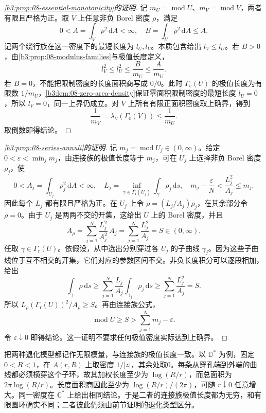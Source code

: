 \begin{proof}[\cref{b3:prop:08-essential-monotonicity}的证明]
记 \(m_U=\operatorname{mod}U\)、\(m_V=\operatorname{mod}V\)，两者有限且严格为正。取 \(V\) 上任意非负 Borel 密度 \(\rho\)，满足
\[
 0<A=\int_V\rho^2\,\mathrm dA<\infty,
 \quad B=\int_U\rho^2\,\mathrm dA\le A.
\]
记两个绕行族在这一密度下的最短长度为 \(l_U,l_V\)。本质包含给出 \(l_V\le l_U\)。若 \(B>0\)，由\cref{b3:prop:08-modulus-families}与极值长度定义，
\[
 l_V^2\le l_U^2\le\frac{B}{m_U}\le\frac{A}{m_U}.
\]
若 \(B=0\)，不能把限制密度的长度面积商写成 \(0/0\)。此时 \(\Gamma_{\mathrm c}(U)\) 的极值长度为有限数 \(1/m_U\)，\cref{b3:lem:08-zero-area-density}保证零面积限制密度的最短长度 \(l_U=0\)，所以 \(l_V=0\)，同一上界仍成立。对 \(V\) 上所有有限正面积密度取上确界，得到
\[
 \frac1{m_V}=\lambda_V(\Gamma_{\mathrm c}(V))\le\frac1{m_U}.
\]
取倒数即得结论。
\end{proof}

\begin{proof}[\cref{b3:prop:08-series-annuli}的证明]
记 \(m_j=\operatorname{mod}U_j\in(0,\infty)\)。给定 \(0<\varepsilon<\min_jm_j\)，由连接族的极值长度等于 \(m_j\)，可在 \(U_j\) 上选择非负 Borel 密度 \(\rho_j\)，使
\[
 0<A_j=\int_{U_j}\rho_j^2\,\mathrm dA<\infty,
 \quad L_j=\inf_{\gamma\in\Gamma_{\mathrm r}(U_j)}
          \int_\gamma\rho_j\,\mathrm ds,
 \quad m_j-\frac\varepsilon N<\frac{L_j^2}{A_j}\le m_j.
\]
因此每个 \(L_j\) 都有限且严格为正。在 \(U_j\) 上令 \(\rho=(L_j/A_j)\rho_j\)，在其余部分令 \(\rho=0\)。由于 \(U_j\) 是两两不交的开集，这给出 \(U\) 上的 Borel 密度，并且
\[
 A_\rho=\sum_{j=1}^N\frac{L_j^2}{A_j^2}\,A_j
 =\sum_{j=1}^N\frac{L_j^2}{A_j}=S\in(0,\infty).
\]
任取 \(\gamma\in\Gamma_{\mathrm r}(U)\)。依假设，从中选出分别穿过各 \(U_j\) 的子曲线 \(\gamma_j\)。因为这些子曲线位于互不相交的开集，它们对应的参数区间不交。非负长度积分可以逐段相加，给出
\[
 \int_\gamma\rho\,\mathrm ds
 \ge\sum_{j=1}^N\frac{L_j}{A_j}
       \int_{\gamma_j}\rho_j\,\mathrm ds
 \ge\sum_{j=1}^N\frac{L_j^2}{A_j}=S.
\]
所以 \(L_\rho(\Gamma_{\mathrm r}(U))^2/A_\rho\ge S\)。再由连接族公式，
\[
 \operatorname{mod}U\ge S>
 \sum_{j=1}^Nm_j-\varepsilon.
\]
令 \(\varepsilon\downarrow0\) 即得结论。这一证明不要求任何极值密度实际达到上确界。
\end{proof}

\ProseParagraphBreak
把两种退化模型都记作无限模量，与连接族的极值长度一致。以 \(\mathbb D^*\) 为例，固定 \(0<R<1\)，在 \(A(r,R)\) 上取密度 \(1/|z|\)，其余处取0。每条从穿孔端到外端的曲线都必须横穿这个子环，故其加权长度至少为 \(\log(R/r)\)，而总面积为 \(2\pi\log(R/r)\)。长度面积商因此至少为 \(\log(R/r)/(2\pi)\)，可随 \(r\downarrow0\) 任意增大。同一密度在 \(\mathbb C^*\) 上给出相同结论。于是二者的连接族极值长度都为无穷，和有限圆环确实不同；二者彼此仍须由前节证明的退化类型区分。

